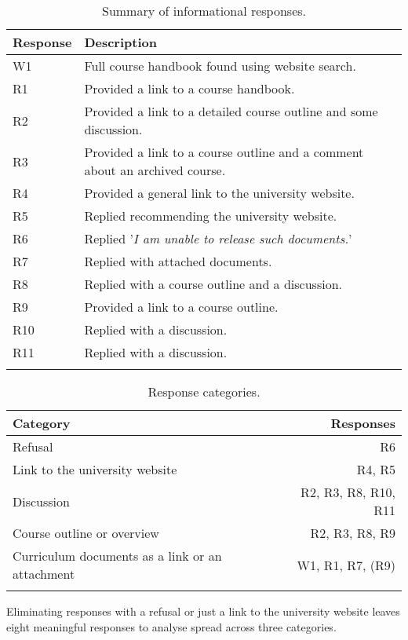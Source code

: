 \begin{table}
\begin{tabular}{ll}
\toprule
Response & Description \\
\midrule
W1 & Full course handbook found using website search.\\
R1 & Provided a link to a course handbook.\\
R2 & Provided a link to a detailed course outline and some discussion. \\
R3 & Provided a link to a course outline and a comment about an archived course. \\
R4 & Provided a general link to the university website.  \\
R5 & Replied recommending the university website. \\
R6 & Replied '\emph{I am unable to release such documents.}'  \\
R7 & Replied with attached documents.  \\
R8 & Replied with a course outline and a discussion.  \\
R9 & Provided a link to a course outline.  \\
R10 & Replied with a discussion.  \\
R11 & Replied with a discussion.  \\
\bottomrule \\
\end{tabular}
\caption{\label{responses-table}Summary of informational responses.}
\end{table}

\begin{table}
\begin{tabular}{lr} \toprule
Category & Responses \\
\midrule
Refusal & R6 \\
Link to the university website & R4, R5 \\
Discussion & R2, R3, R8, R10, R11 \\
Course outline or overview & R2, R3, R8, R9 \\
Curriculum documents as a link or an attachment & W1, R1, R7, (R9) \\
\bottomrule \\
\end{tabular}
\caption{\label{categories-table}Response categories.}
\end{table}

Eliminating responses with a refusal or just a link to the university website leaves eight meaningful responses to analyse spread across three categories.

